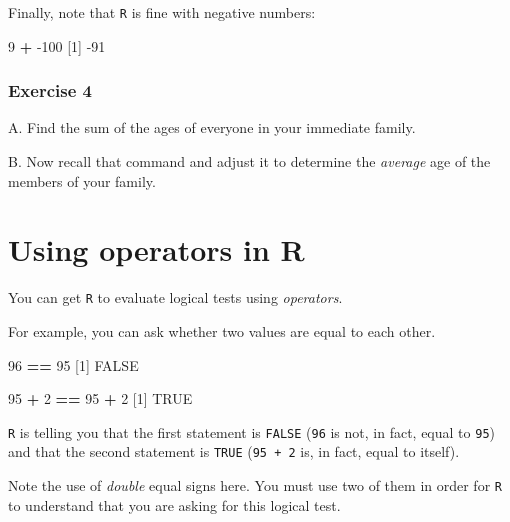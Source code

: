 \documentclass[
]{book}
\newenvironment{Shaded}{\begin{snugshade}}{\end{snugshade}}
\newcommand{\DecValTok}[1]{\textcolor[rgb]{0.00,0.00,0.81}{#1}}
\newcommand{\NormalTok}[1]{#1}
\newcommand{\OperatorTok}[1]{\textcolor[rgb]{0.81,0.36,0.00}{\textbf{#1}}}
\newcommand{\OtherTok}[1]{\textcolor[rgb]{0.56,0.35,0.01}{#1}}
\newcommand{\StringTok}[1]{\textcolor[rgb]{0.31,0.60,0.02}{#1}}
\begin{document}
Finally, note that \texttt{R} is fine with negative numbers:

\begin{Shaded}
\begin{Highlighting}[]
\DecValTok{9} \OperatorTok{+}\StringTok{ }\DecValTok{-100}
\NormalTok{[}\DecValTok{1}\NormalTok{] }\DecValTok{-91}
\end{Highlighting}
\end{Shaded}

\hypertarget{exercise-4}{%
\subsubsection*{Exercise 4}\label{exercise-4}}

A. Find the sum of the ages of everyone in your immediate family.

B. Now recall that command and adjust it to determine the \emph{average} age of the members of your family.

\hypertarget{using-operators-in-r}{%
\section*{Using operators in R}\label{using-operators-in-r}}

You can get \texttt{R} to evaluate logical tests using \emph{operators}.

For example, you can ask whether two values are equal to each other.

\begin{Shaded}
\begin{Highlighting}[]
\DecValTok{96} \OperatorTok{==}\StringTok{ }\DecValTok{95}
\NormalTok{[}\DecValTok{1}\NormalTok{] }\OtherTok{FALSE}

\DecValTok{95} \OperatorTok{+}\StringTok{ }\DecValTok{2} \OperatorTok{==}\StringTok{ }\DecValTok{95} \OperatorTok{+}\StringTok{ }\DecValTok{2}
\NormalTok{[}\DecValTok{1}\NormalTok{] }\OtherTok{TRUE}
\end{Highlighting}
\end{Shaded}

\texttt{R} is telling you that the first statement is \texttt{FALSE} (\texttt{96} is not, in fact, equal to \texttt{95}) and that the second statement is \texttt{TRUE} (\texttt{95\ +\ 2} is, in fact, equal to itself).

Note the use of \emph{double} equal signs here. You must use two of them in order for \texttt{R} to understand that you are asking for this logical test.
\end{document}
